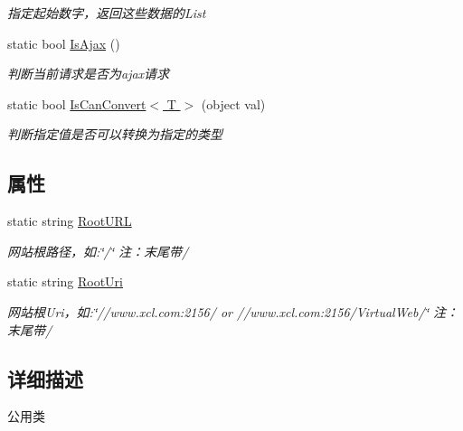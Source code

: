 \begin{DoxyCompactItemize}
\begin{DoxyCompactList}\small\item\em 指定起始数字，返回这些数据的\+List \end{DoxyCompactList}\item 
static bool \hyperlink{class_x_c_l_net_tools_1_1_string_hander_1_1_common_a2573b0ab4c60ce76ab6713ed40339db4}{Is\+Ajax} ()
\begin{DoxyCompactList}\small\item\em 判断当前请求是否为ajax请求 \end{DoxyCompactList}\item 
static bool \hyperlink{class_x_c_l_net_tools_1_1_string_hander_1_1_common_a9e27b7aee03f20572b1d66d1df37dbbc}{Is\+Can\+Convert$<$ T $>$} (object val)
\begin{DoxyCompactList}\small\item\em 判断指定值是否可以转换为指定的类型 \end{DoxyCompactList}\end{DoxyCompactItemize}
\subsection*{属性}
\begin{DoxyCompactItemize}
\item 
static string \hyperlink{class_x_c_l_net_tools_1_1_string_hander_1_1_common_a87e9775b7bdaaf9bc205a148b1335ee2}{Root\+U\+RL}
\begin{DoxyCompactList}\small\item\em 网站根路径，如\+:\char`\"{}/\char`\"{} 注：末尾带\textquotesingle{}/\textquotesingle{} \end{DoxyCompactList}\item 
static string \hyperlink{class_x_c_l_net_tools_1_1_string_hander_1_1_common_ae924e6a3e073efd4a75d53ea7095f976}{Root\+Uri}
\begin{DoxyCompactList}\small\item\em 网站根\+Uri，如\+:\char`\"{}//www.\+xcl.\+com\+:2156/ or //www.\+xcl.\+com\+:2156/\+Virtual\+Web/\char`\"{} 注：末尾带\textquotesingle{}/\textquotesingle{} \end{DoxyCompactList}\end{DoxyCompactItemize}


\subsection{详细描述}
公用类 



